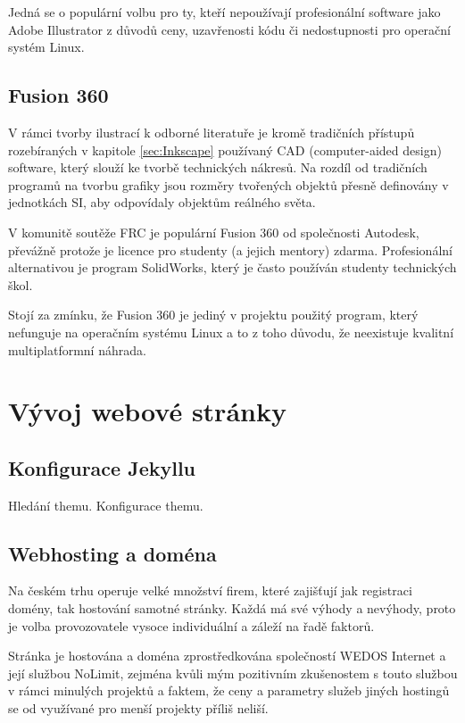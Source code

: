 \documentclass[a4paper, 12pt]{article}
\begin{document}
  Jedná se o populární volbu pro ty, kteří nepoužívají profesionální software jako Adobe Illustrator z důvodů ceny, uzavřenosti kódu či nedostupnosti pro operační systém Linux\cite{illustrator-pricing}.


  \subsection{Fusion 360}
  V rámci tvorby ilustrací k odborné literatuře je kromě tradičních přístupů rozebíraných v kapitole \ref{sec:Inkscape} používaný CAD (computer-aided design) software, který slouží ke tvorbě technických nákresů. Na rozdíl od tradičních programů na tvorbu grafiky jsou rozměry tvořených objektů přesně definovány v jednotkách SI, aby odpovídaly objektům reálného světa.

  V komunitě soutěže FRC je populární Fusion 360 od společnosti Autodesk, převážně protože je licence pro studenty (a jejich mentory) zdarma\cite{fusion-360-pricing}. Profesionální alternativou je program SolidWorks, který je často používán studenty technických škol.

  Stojí za zmínku, že Fusion 360 je jediný v projektu použitý program, který nefunguje na operačním systému Linux a to z toho důvodu, že neexistuje kvalitní multiplatformní náhrada.


  \section{Vývoj webové stránky}

  \subsection{Konfigurace Jekyllu}
  Hledání themu.
  Konfigurace themu.

  \subsection{Webhosting a doména} \label{sec:Webhosting a doména}
  Na českém trhu operuje velké množství firem, které zajišťují jak registraci domény, tak hostování samotné stránky. Každá má své výhody a nevýhody, proto je volba provozovatele vysoce individuální a záleží na řadě faktorů.

  Stránka je hostována a doména zprostředkována společností WEDOS Internet a její službou NoLimit\cite{wedos-hosting}, zejména kvůli mým pozitivním zkušenostem s touto službou v rámci minulých projektů a faktem, že ceny a parametry služeb jiných hostingů se od využívané pro menší projekty příliš neliší.
\end{document}
